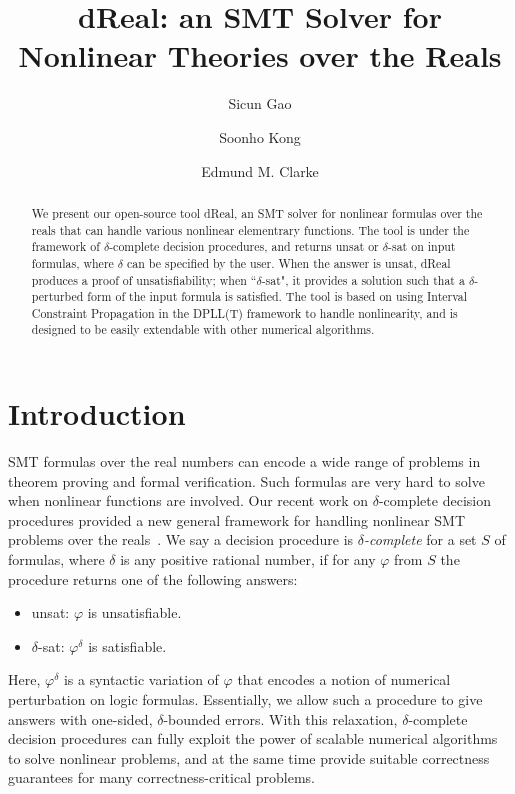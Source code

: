 \documentclass[envcountsect]{llncs}
\title{{\sf dReal}: an SMT Solver for Nonlinear Theories over the Reals}
\author{Sicun Gao \and Soonho Kong \and Edmund M. Clarke}
\institute{Carnegie Mellon University, Pittsburgh, PA 15213}
\begin{document}
\maketitle

\begin{abstract}
We present our open-source tool {\sf dReal}, an SMT solver for
nonlinear formulas over the reals that can handle various nonlinear elementrary
functions. The tool is under the framework of $\delta$-complete decision
procedures, and returns {\sf unsat} or {\sf $\delta$-sat} on input formulas,
where $\delta$ can be specified by the user. When the answer is {\sf unsat},
{\sf dReal} produces a proof of unsatisfiability; when ``$\delta$-sat", it
provides a solution such that a $\delta$-perturbed form of the input formula is
satisfied. The tool is based on using Interval Constraint Propagation in the
DPLL(T) framework to handle nonlinearity, and is
designed to be easily extendable with other numerical algorithms.
\end{abstract}

\section{Introduction}

SMT formulas over the real numbers can encode a wide range of problems in
theorem proving and formal verification. Such formulas are very hard to solve
when nonlinear functions are involved. Our recent work on
{$\delta$-complete decision procedures} provided a new general framework for
handling nonlinear SMT problems over the reals~\cite{DBLP:conf/cade/GaoAC12}. We say a decision
procedure is {\em $\delta$-complete} for a set $S$ of formulas, where $\delta$
is any positive rational number, if for any $\varphi$ from $S$ the procedure
returns one of the following answers:
\begin{itemize}
 \item {\sf unsat}: $\varphi$ is unsatisfiable.
 \item {\sf $\delta$-sat}: $\varphi^{\delta}$ is satisfiable.
\end{itemize}
Here, $\varphi^{\delta}$ is a syntactic variation of $\varphi$ that encodes a
notion of numerical perturbation on logic formulas. Essentially, we allow such a
procedure to give answers with one-sided, $\delta$-bounded errors. With this
relaxation, $\delta$-complete decision procedures can fully exploit the
power of scalable numerical algorithms to solve nonlinear
problems, and at the same time provide suitable correctness
guarantees for many correctness-critical problems.
\end{document}

